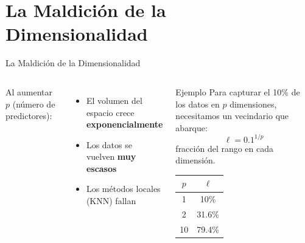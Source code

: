 \documentclass[aspectratio=169, 10pt]{beamer}
\newcommand{\y}{\bm{y}}
\begin{document}
\section{La Maldición de la Dimensionalidad}

\begin{frame}{La Maldición de la Dimensionalidad}
\begin{columns}[T]
  \vspace{0.1cm}
  Al aumentar $p$ (número de predictores):
  \begin{itemize}
    \item El volumen del espacio crece \textbf{exponencialmente}
    \item Los datos se vuelven \textbf{muy escasos}
    \item Los métodos locales (KNN) fallan
  \end{itemize}

  \begin{block}{Ejemplo}
    \small Para capturar el 10\% de los datos en $p$ dimensiones,
    necesitamos un vecindario que abarque:
    \[\ell = 0.1^{1/p}\]
    fracción del rango en cada dimensión.

    \begin{tabular}{cc}
      \toprule
      $p$ & $\ell$ \\
      \midrule
      1 & 10\% \\
      2 & 31.6\% \\
      10 & 79.4\% \\
      \bottomrule
    \end{tabular}
  \end{block}

\end{columns}
\end{frame}
\end{document}
